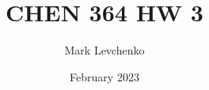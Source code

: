 \documentclass[12pt]{article}
\title{CHEN 364 HW 3}
\author{Mark Levchenko}
\date{February 2023}
\begin{document}
\begin{enumerate}
 
    

    

    

    

    

    

    

\end{enumerate}
\end{document}
